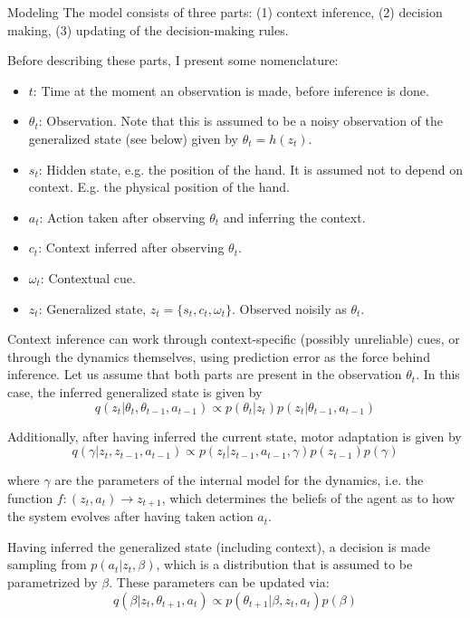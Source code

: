 \documentclass{report}
\begin{document}
\begin{chapter}{Modeling}
The model consists of three parts: (1) context inference, (2) decision making,
(3) updating of the decision-making rules.

Before describing these parts, I present some nomenclature:
\begin{itemize}
\item $t$: Time at the moment an observation is made, before inference is done.
\item $\theta_t$: Observation. Note that this is assumed to be a noisy
observation of the generalized state (see below) given by $\theta_t = h(z_t)$.
\item $s_t$: Hidden state, e.g. the position of the hand. It is assumed not to
depend on context. E.g. the physical position of the hand.
\item $a_t$: Action taken after observing $\theta_t$ and inferring the context.
\item $c_t$: Context inferred after observing $\theta_t$.
\item $\omega_t$: Contextual cue.
\item $z_t$: Generalized state, $z_t = \{s_t, c_t, \omega_t\}$. Observed noisily
as $\theta_t$.
\end{itemize}

Context inference can work through context-specific (possibly unreliable) cues,
or through the dynamics themselves, using prediction error as the force behind
inference. Let us assume that both parts are present in the observation
$\theta_t$. In this case, the inferred generalized state is given by
\[
  q(z_t | \theta_t, \theta_{t-1}, a_{t-1}) \propto p(\theta_t | z_t)p(z_t|\theta_{t-1}, a_{t-1})
\]
  
Additionally, after having inferred the current state, motor adaptation is given by
\[
q(\gamma | z_t, z_{t-1}, a_{t-1}) \propto p(z_t | z_{t-1}, a_{t-1}, \gamma)p(z_{t-1})p(\gamma)
\]

where $\gamma$ are the parameters of the internal model for the dynamics,
i.e. the function $f: (z_t, a_t) \rightarrow z_{t+1}$, which determines the beliefs of
the agent as to how the system evolves after having taken action $a_t$.

Having inferred the generalized state (including context), a decision is made
sampling from $p(a_t | z_t, \beta)$, which is a distribution that is assumed to
be parametrized by $\beta$. These parameters can be updated via:
\[
q(\beta | z_t, \theta_{t+1}, a_t) \propto p(\theta_{t+1} | \beta, z_t,
a_t)p(\beta) \label{eqn:update-parameters}
\]


\end{chapter}
\end{document}

